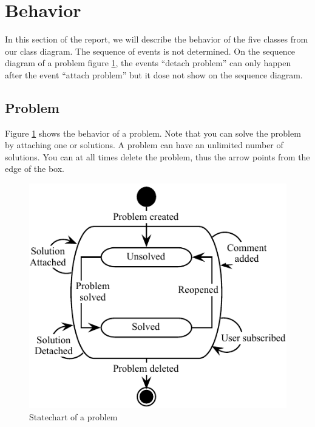  \section{Behavior}
In this section of the report, we will describe the behavior of the five classes from our class diagram. The sequence of events is not determined. On the sequence diagram of a problem figure \ref{fig:Klasse_diagram_problem}, the events ``detach problem'' can only happen after the event ``attach problem'' but it dose not show on the sequence diagram.      


\subsection{Problem}
\label{sub:problem}
Figure \ref{fig:Klasse_diagram_problem} shows the behavior of a problem. Note that you can solve the problem by attaching one or solutions. A problem can have an unlimited number of solutions. You can at all times delete the problem, thus the arrow points from the edge of the box.
\begin{figure}[H]
\begin{center}
\includegraphics[scale=1]{input/problem_domain_analysis/Klassediagram_problem.pdf}
\caption{Statechart of a problem}
\label{fig:Klasse_diagram_problem}
\end{center}
\end{figure}

